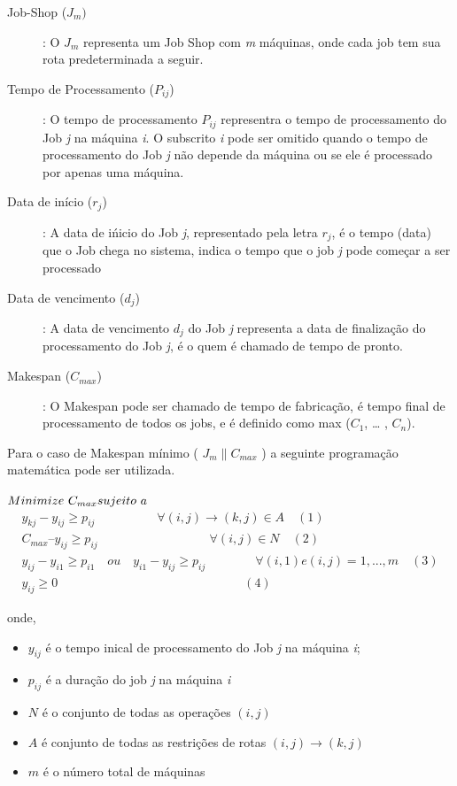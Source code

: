 \begin{description}

\item [Job-Shop ($J_{m})$]: O $J_m$ representa um Job Shop com {\it m} máquinas, onde cada job tem sua rota predeterminada a seguir.

\item [Tempo de Processamento ($P_{ij}$)]: O tempo de processamento $P_{ij}$ representra o tempo de processamento do Job {\it j} na máquina {\it i}. O subscrito {\it i} pode ser omitido quando o tempo de processamento do Job {\it j} não depende da máquina ou se ele é processado por apenas uma máquina.

\item [Data de início ($r_j$)]: A data de ińicio do Job {\it j}, representado pela letra $r_j$, é o tempo (data) que o Job chega no sistema, indica o tempo que o job {\it j} pode começar a ser processado

\item [Data de vencimento ($d_j$)]: A data de vencimento $d_j$ do Job {\it j} representa a data de finalização do processamento do Job {\it j}, é o quem é chamado de tempo de pronto.

\item [Makespan ($C_{max}$)]: O Makespan pode ser chamado de tempo de fabricação, é tempo final de processamento de todos os jobs, e é definido como max ($C_1$, … , $C_n$).
\end{description}

Para o caso de Makespan mínimo ( $J_m \parallel C_{max}$ ) a seguinte programação matemática pode ser utilizada.

$\\Minimize\ C_{max}\\ \\
sujeito\ a$
\begin{eqnarray*}
        y_{kj}-y_{ij}\geq p_{ij} \qquad \qquad \quad \forall (i,j) \rightarrow (k,j) \in A  \quad (1)\\
        C_{max} – y_{ij}\geq p_{ij} \qquad \qquad \qquad \qquad \quad \forall (i,j) \in N \quad (2)\\
        y_{ij}-y_{i1}\geq p_{i1}\quad ou \quad y_{i1}-y_{ij}\geq p_{ij} \qquad \qquad\forall(i,1) e (i,j) = 1, ..., m \quad (3) \\
         y_{ij}\geq 0 \qquad \qquad \quad \qquad \qquad \qquad \qquad \qquad (4)
\end{eqnarray*}

onde,
\begin{itemize}

\item $y_{ij}$ é o tempo inical de processamento do Job {\it j} na máquina {\it i};
\item $p_{ij}$ é a duração do job {\it j} na máquina {\it i}
\item $N$ é o conjunto de todas as operações $(i,j)$
\item $A$ é conjunto de todas as restrições de rotas $(i,j) \rightarrow (k,j)$
\item $m$ é o número total de máquinas

\end{itemize}


